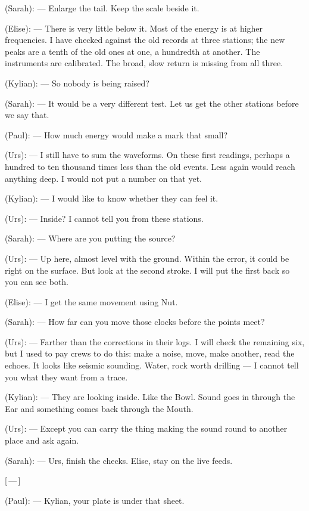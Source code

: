 \begin{room}
(Sarah): --- Enlarge the tail. Keep the scale beside it.

(Elise): --- There is very little below it. Most of the energy is at higher frequencies. I have checked against the old records at three stations; the new peaks are a tenth of the old ones at one, a hundredth at another. The instruments are calibrated. The broad, slow return is missing from all three.

(Kylian): --- So nobody is being raised?

(Sarah): --- It would be a very different test. Let us get the other stations before we say that.

(Paul): --- How much energy would make a mark that small?

(Urs): --- I still have to sum the waveforms. On these first readings, perhaps a hundred to ten thousand times less than the old events. Less again would reach anything deep. I would not put a number on that yet.

(Kylian): --- I would like to know whether they can feel it.

(Urs): --- Inside? I cannot tell you from these stations.

(Sarah): --- Where are you putting the source?

(Urs): --- Up here, almost level with the ground. Within the error, it could be right on the surface. But look at the second stroke. I will put the first back so you can see both.

(Elise): --- I get the same movement using Nut.

(Sarah): --- How far can you move those clocks before the points meet?

(Urs): --- Farther than the corrections in their logs. I will check the remaining six, but I used to pay crews to do this: make a noise, move, make another, read the echoes. It looks like seismic sounding. Water, rock worth drilling --- I cannot tell you what they want from a trace.

(Kylian): --- They are looking inside. Like the Bowl. Sound goes in through the Ear and something comes back through the Mouth.

(Urs): --- Except you can carry the thing making the sound round to another place and ask again.

(Sarah): --- Urs, finish the checks. Elise, stay on the live feeds.

\centerline{[\,---\,]}

(Paul): --- Kylian, your plate is under that sheet.


\end{room}
